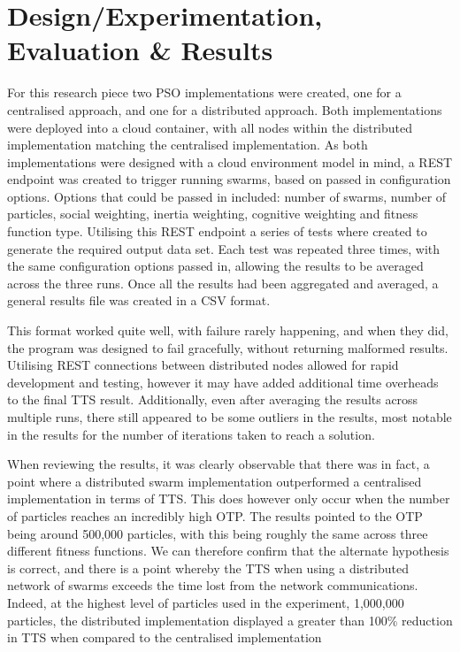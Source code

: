 \documentclass[oneside,12pt]{book}
\begin{document}
\section{Design/Experimentation, Evaluation \& Results}
For this research piece two PSO implementations were created, one for a centralised approach, and one for a distributed approach. Both implementations were deployed into a cloud container, with all nodes within the distributed implementation matching the centralised implementation. As both implementations were designed with a cloud environment model in mind, a REST endpoint was created to trigger running swarms, based on passed in configuration options. Options that could be passed in included: number of swarms, number of particles, social weighting, inertia weighting, cognitive weighting and fitness function type. Utilising this REST endpoint a series of tests where created to generate the required output data set. Each test was repeated three times, with the same configuration options passed in, allowing the results to be averaged across the three runs. 
Once all the results had been aggregated and averaged, a general results file was created in a CSV format. 

This format worked quite well, with failure rarely happening, and when they did, the program was designed to fail gracefully, without returning malformed results. Utilising REST connections between distributed nodes allowed for rapid development and testing, however it may have added additional time overheads to the final TTS result. Additionally, even after averaging the results across multiple runs, there still appeared to be some outliers in the results, most notable in the results for the number of iterations taken to reach a solution. 

When reviewing the results, it was clearly observable that there was in fact, a point where a distributed swarm implementation outperformed a centralised implementation in terms of TTS. This does however only occur when the number of particles reaches an incredibly high OTP. The results pointed to the OTP being around 500,000 particles, with this being roughly the same across three different fitness functions. We can therefore confirm that the alternate hypothesis is correct, and there is a point whereby the TTS when using a distributed network of swarms exceeds the time lost from the network communications. Indeed, at the highest level of particles used in the experiment, 1,000,000 particles, the distributed implementation displayed a greater than 100\% reduction in TTS when compared to the centralised implementation
\end{document}
